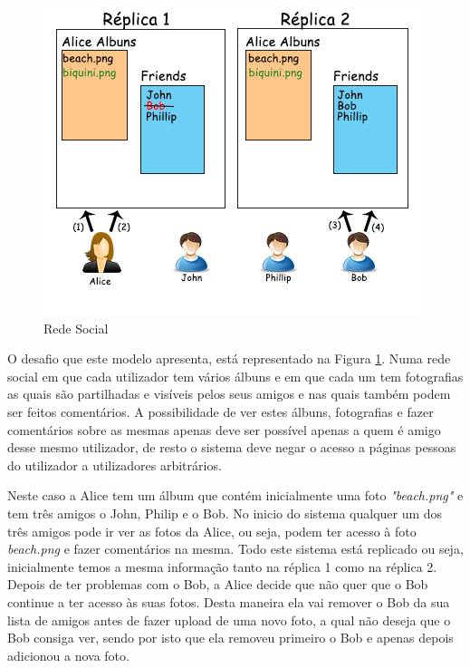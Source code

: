 \documentclass[runningheads,a4paper]{llncs}
\begin{document}
\begin{figure}[h]
\centering
\includegraphics[scale=0.6]{Figure1}
\caption{Rede Social}
\label{fig:figure1.1}
\end{figure}

O desafio que este modelo apresenta, está representado na Figura \ref{fig:figure1.1}. Numa rede social em que cada utilizador tem vários álbuns e em que cada um tem fotografias as quais são partilhadas e visíveis pelos seus amigos e nas quais também podem ser feitos comentários. A possibilidade de ver estes álbuns, fotografias e fazer comentários sobre as mesmas apenas deve ser possível apenas a quem é amigo desse mesmo utilizador, de resto o sistema deve negar o acesso a páginas pessoas do utilizador a utilizadores arbitrários.

Neste caso a Alice tem um álbum que contém inicialmente uma foto \textit{"beach.png"} e tem três amigos o John, Philip e o Bob. No inicio do sistema qualquer um dos três amigos pode ir ver as fotos da Alice, ou seja, podem ter acesso à foto \textit{beach.png}  e fazer comentários na mesma. Todo este sistema está replicado ou seja, inicialmente temos a mesma informação tanto na réplica 1 como na réplica 2.
Depois de ter problemas com o Bob, a Alice decide que não quer que o Bob continue a ter acesso às suas fotos. Desta maneira ela vai remover o Bob da sua lista de amigos antes de fazer upload de uma novo foto, a qual não deseja que o Bob consiga ver, sendo por isto que ela removeu primeiro o Bob e apenas depois adicionou a nova foto.
\end{document}
